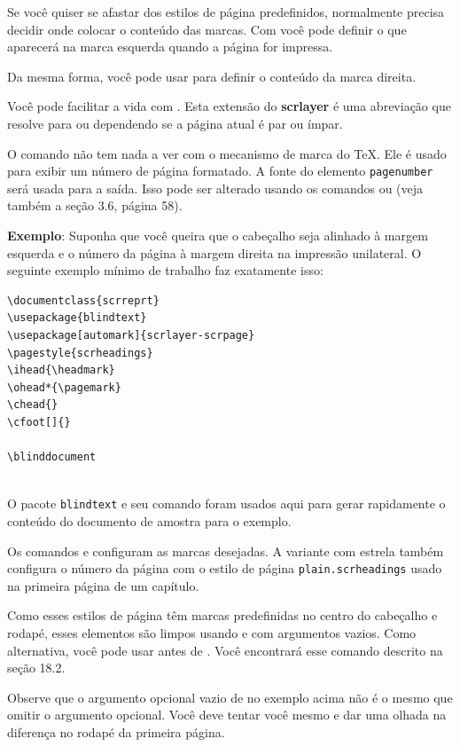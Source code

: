 Se você quiser se afastar dos estilos de página predefinidos, normalmente precisa decidir onde colocar o conteúdo das marcas. Com  você pode definir o que aparecerá na marca esquerda quando a página for impressa.

Da mesma forma, você pode usar  para definir o conteúdo da marca direita.

Você pode facilitar a vida com . Esta extensão do \textbf{scrlayer} é uma abreviação que resolve para  ou  dependendo se a página atual é par ou ímpar.

O comando  não tem nada a ver com o mecanismo de marca do TeX. Ele é usado para exibir um número de página formatado. A fonte do elemento \texttt{pagenumber} será usada para a saída. Isso pode ser alterado usando os comandos  ou  (veja também a seção 3.6, página 58).

\textbf{Exemplo}: Suponha que você queira que o cabeçalho seja alinhado à margem esquerda e o número da página à margem direita na impressão unilateral. O seguinte exemplo mínimo de trabalho faz exatamente isso:
\begin{verbatim}
\documentclass{scrreprt}
\usepackage{blindtext}
\usepackage[automark]{scrlayer-scrpage}
\pagestyle{scrheadings}
\ihead{\headmark}
\ohead*{\pagemark}
\chead{}
\cfoot[]{}

\blinddocument
  
\end{verbatim}

O pacote \texttt{blindtext} e seu comando  foram usados aqui para gerar rapidamente o conteúdo do documento de amostra para o exemplo.

Os comandos  e  configuram as marcas desejadas. A variante  com estrela também configura o número da página com o estilo de página \texttt{plain.scrheadings} usado na primeira página de um capítulo.

Como esses estilos de página têm marcas predefinidas no centro do cabeçalho e rodapé, esses elementos são limpos usando  e  com argumentos vazios. Como alternativa, você pode usar  antes de . Você encontrará esse comando descrito na seção 18.2.

Observe que o argumento opcional vazio de  no exemplo acima não é o mesmo que omitir o argumento opcional. Você deve tentar você mesmo e dar uma olhada na diferença no rodapé da primeira página.

